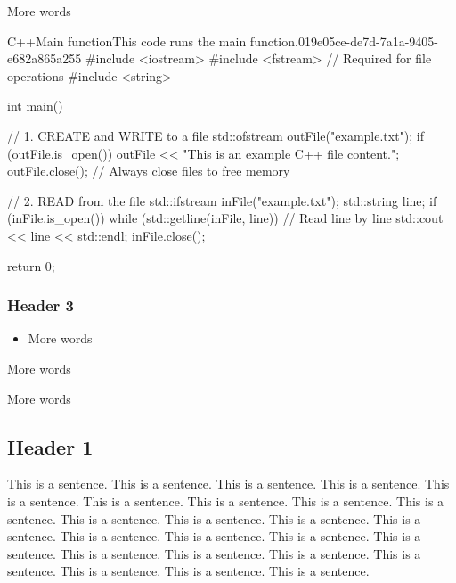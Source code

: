 More words

\begin{notebookcodeblock}{C++}{Main function}{This code runs the main function.}{019e05ce-de7d-7a1a-9405-e682a865a255}
#include <iostream>
#include <fstream> // Required for file operations
#include <string>

int main() {
    // 1. CREATE and WRITE to a file
    std::ofstream outFile("example.txt"); 
    if (outFile.is_open()) {
        outFile << "This is an example C++ file content.\n";
        outFile.close(); // Always close files to free memory
    }

    // 2. READ from the file
    std::ifstream inFile("example.txt");
    std::string line;
    if (inFile.is_open()) {
        while (std::getline(inFile, line)) { // Read line by line
            std::cout << line << std::endl;
        }
        inFile.close();
    }

    return 0;
}
\end{notebookcodeblock}

\subsubsection{Header 3}

\begin{itemize}
  \item More words
\end{itemize}


More words


More words

\subsection{Header 1}

This is a sentence. This is a sentence. This is a sentence. This is a sentence. This is a sentence. This is a sentence. This is a sentence. This is a sentence. This is a sentence. This is a sentence. This is a sentence. This is a sentence. This is a sentence. This is a sentence. This is a sentence. This is a sentence. This is a sentence. This is a sentence. This is a sentence. This is a sentence. This is a sentence. This is a sentence. This is a sentence. This is a sentence.

